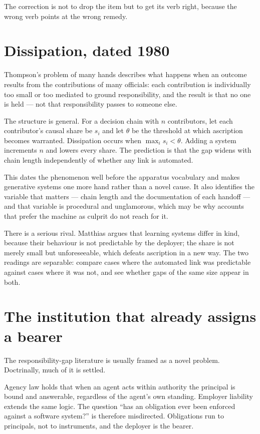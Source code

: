 \documentclass[11pt,a4paper]{article}
\begin{document}
The correction is not to drop the item but to get its verb right, because the wrong verb points at the wrong remedy.

\section{Dissipation, dated 1980}
Thompson's problem of many hands describes what happens when an outcome results from the contributions of many officials: each contribution is individually too small or too mediated to ground responsibility, and the result is that no one is held --- not that responsibility passes to someone else.

The structure is general. For a decision chain with $n$ contributors, let each contributor's causal share be $s_i$ and let $\theta$ be the threshold at which ascription becomes warranted. Dissipation occurs when $\max_i s_i < \theta$. Adding a system increments $n$ and lowers every share. The prediction is that the gap widens with chain length independently of whether any link is automated.

This dates the phenomenon well before the apparatus vocabulary and makes generative systems one more hand rather than a novel cause. It also identifies the variable that matters --- chain length and the documentation of each handoff --- and that variable is procedural and unglamorous, which may be why accounts that prefer the machine as culprit do not reach for it.

There is a serious rival. Matthias argues that learning systems differ in kind, because their behaviour is not predictable by the deployer; the share is not merely small but unforeseeable, which defeats ascription in a new way. The two readings are separable: compare cases where the automated link was predictable against cases where it was not, and see whether gaps of the same size appear in both.

\section{The institution that already assigns a bearer}
The responsibility-gap literature is usually framed as a novel problem. Doctrinally, much of it is settled.

Agency law holds that when an agent acts within authority the principal is bound and answerable, regardless of the agent's own standing. Employer liability extends the same logic. The question ``has an obligation ever been enforced against a software system?'' is therefore misdirected. Obligations run to principals, not to instruments, and the deployer is the bearer.
\end{document}
